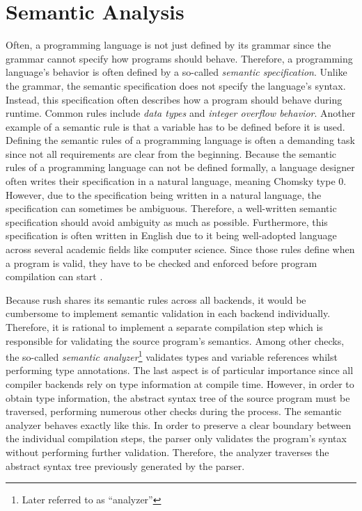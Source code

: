 \section{Semantic Analysis}

Often, a programming language is not just defined by its grammar
since the grammar cannot specify how programs should behave.
Therefore, a programming language's behavior is often defined by a so-called \emph{semantic specification}.
Unlike the grammar, the semantic specification does not specify the language's syntax.
Instead, this specification often describes how a program should behave during runtime.
Common rules include \emph{data types} and \emph{integer overflow behavior}.
Another example of a semantic rule is that a variable has to be defined before it is used.
Defining the semantic rules of a programming language is often a demanding task
since not all requirements are clear from the beginning.
Because the semantic rules of a programming language can not be defined formally,
a language designer often writes their specification in a natural language, meaning Chomsky type 0.
However, due to the specification being written in a natural language, the specification can sometimes be ambiguous.
Therefore, a well-written semantic specification should avoid ambiguity as much as possible.
Furthermore, this specification is often written in English
due to it being well-adopted language across several academic fields like computer science.
Since those rules define when a program is valid, they have to be checked and enforced before program compilation can start
\cite[p.~21]{a_practical_guide_compiler_construction_watson_2017}.

Because rush shares its semantic rules across all backends,
it would be cumbersome to implement semantic validation in each
backend individually. Therefore, it is rational to implement a separate
compilation step which is responsible for validating the source program's
semantics. Among other checks, the so-called \emph{semantic analyzer}\footnote{Later referred to as \enquote{analyzer}} validates types
and variable references whilst performing type annotations. The last aspect is
of particular importance since all compiler backends rely on type information at
compile time. However, in order to obtain type information, the abstract syntax
tree of the source program must be traversed, performing numerous other checks
during the process. The semantic analyzer behaves exactly like this. In order to
preserve a clear boundary between the individual compilation steps, the parser
only validates the program's syntax without performing further validation.
Therefore, the analyzer traverses the abstract syntax tree previously generated
by the parser.

